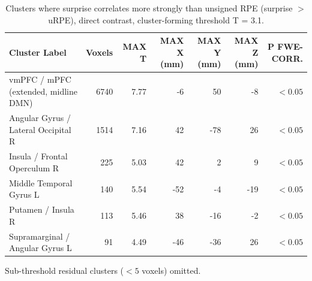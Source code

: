 \begin{table}[htbp]
    \centering
    \rev%
    \begin{threeparttable}
    \caption{Clusters where surprise correlates more strongly than unsigned RPE
    (surprise $>$ uRPE), direct contrast, cluster-forming threshold T = 3.1.}
    \label{tab:con13_neg}%
    \begin{tabularx}{\textwidth}{l *{6}{R}}
        \toprule
        \textbf{Cluster Label} & \textbf{Voxels} & \textbf{MAX T} & \textbf{MAX X (mm)} & \textbf{MAX Y (mm}) & \textbf{MAX Z (mm)} & \textbf{P FWE-CORR.} \\
        \midrule
        vmPFC / mPFC (extended, midline DMN) & 6740 & 7.77 & -6 & 50 & -8 & $<0.05$ \\
        Angular Gyrus / Lateral Occipital R & 1514 & 7.16 & 42 & -78 & 26 & $<0.05$ \\
        Insula / Frontal Operculum R & 225 & 5.03 & 42 & 2 & 9 & $<0.05$ \\
        Middle Temporal Gyrus L & 140 & 5.54 & -52 & -4 & -19 & $<0.05$ \\
        Putamen / Insula R & 113 & 5.46 & 38 & -16 & -2 & $<0.05$ \\
        Supramarginal / Angular Gyrus L & 91 & 4.49 & -46 & -36 & 26 & $<0.05$ \\
        \bottomrule
    \end{tabularx}
    \begin{tablenotes}\footnotesize
    \item Sub-threshold residual clusters ($<5$ voxels) omitted.
    \end{tablenotes}
    \end{threeparttable}
\end{table}%
